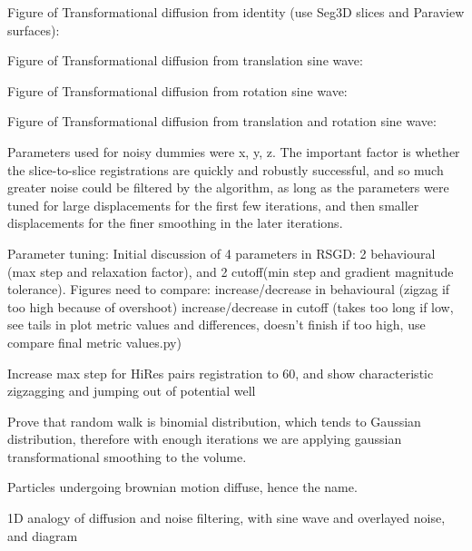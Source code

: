   
  Figure of Transformational diffusion from identity (use Seg3D slices and Paraview surfaces):
  
  Figure of Transformational diffusion from translation sine wave:
  
  Figure of Transformational diffusion from rotation sine wave:
  
  Figure of Transformational diffusion from translation and rotation sine wave:
  
  Parameters used for noisy dummies were x, y, z. The important factor is whether the slice-to-slice registrations are quickly and robustly successful, and so much greater noise could be filtered by the algorithm, as long as the parameters were tuned for large displacements for the first few iterations, and then smaller displacements for the finer smoothing in the later iterations.
  
  Parameter tuning:
  Initial discussion of 4 parameters in RSGD: 2 behavioural (max step and relaxation factor), and 2 cutoff(min step and gradient magnitude tolerance).
  Figures need to compare:
    increase/decrease in behavioural (zigzag if too high because of overshoot)
  increase/decrease in cutoff (takes too long if low, see tails in plot metric values and differences, doesn't finish if too high, use compare final metric values.py)
  
  Increase max step for HiRes pairs registration to 60, and show characteristic zigzagging and jumping out of potential well
  
  Prove that random walk is binomial distribution, which tends to Gaussian distribution, therefore with enough iterations we are applying gaussian transformational smoothing to the volume.
  
  Particles undergoing brownian motion diffuse, hence the name.
  
  1D analogy of diffusion and noise filtering, with sine wave and overlayed noise, and diagram
    
